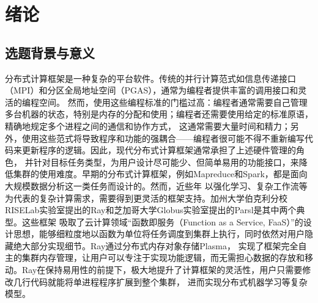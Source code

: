 
\chapter{绪论}
\label{cha:introduction}
\section{选题背景与意义}
\label{sec:background}

分布式计算框架是一种复杂的平台软件。传统的并行计算范式如信息传递接口（MPI\cite{gabriel2004open}）和分区全局地址空间（PGAS\cite{zheng2014upc++}），通常为编程者提供丰富的调用接口和灵活的编程空间。
然而，使用这些编程标准的门槛过高：编程者通常需要自己管理多台机器的状态，特别是内存的分配和使用；编程者还需要使用给定的标准原语，精确地规定多个进程之间的通信和协作方式，
这通常需要大量时间和精力；另外，使用这些范式将导致程序和功能的强耦合——编程者很可能不得不重新编写代码来更新程序的逻辑。因此，现代分布式计算框架通常承担了上述硬件管理的角色，
并针对目标任务类型，为用户设计尽可能少、但简单易用的功能接口，来降低集群的使用难度。早期的分布式计算框架，例如Mapreduce\cite{dean2008mapreduce}和Spark\cite{zaharia2010spark}，都是面向大规模数据分析这一类任务而设计的。然而，近些年
以强化学习、复杂工作流等为代表的复杂计算需求，需要得到更灵活的框架支持。加州大学伯克利分校RISELab实验室提出的Ray\cite{moritz2018ray}和芝加哥大学Globus实验室提出的Parsl\cite{babuji2019parsl}是其中两个典型。这些框架
吸取了云计算领域“函数即服务（Function as a Service, FaaS）”的设计思想，能够细粒度地以函数为单位将任务调度到集群上执行，同时依然对用户隐藏绝大部分实现细节。Ray通过分布式内存对象存储Plasma\cite{plasma}，
实现了框架完全自主的集群内存管理，让用户可以专注于实现功能逻辑，而无需担心数据的存放和移动。Ray在保持易用性的前提下，极大地提升了计算框架的灵活性，用户只需要修改几行代码就能将单进程程序扩展到整个集群，
进而实现分布式机器学习等复杂模型。

